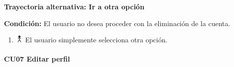 \textbf{Trayectoria alternativa: Ir a otra opción} 

\vspace{0.3em}

\textbf{Condición:} El usuario no desea proceder con la eliminación de la cuenta.
\begin{enumerate}
\item \includegraphics[height=1em]{pictures/actor.png} El usuario simplemente selecciona otra opción.
\end{enumerate} \bigskip



\paragraph{CU07 Editar perfil}

